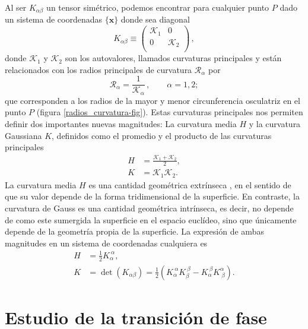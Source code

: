 Al ser $K_{\alpha\beta}$ un tensor simétrico, podemos encontrar para cualquier
punto $P$ dado un sistema de coordenadas $\{\mathbf{x}\}$ donde sea diagonal
\begin{equation*}
K_{\alpha\beta}\equiv\left(\begin{array}{cc}
\mathcal{K}_1 & 0\\
0 & \mathcal{K}_2\\
\end{array}\right)\, ,
\end{equation*} 
donde $\mathcal{K}_1$ y $\mathcal{K}_2$ son los autovalores, llamados
curvaturas principales y están relacionados con los radios principales
de curvatura $\mathcal{R}_{\alpha}$ por
\begin{equation*}
\mathcal{R}_{\alpha}=\frac{1}{\mathcal{K}_{\alpha}} \, , \qquad \alpha=1,2;
\end{equation*}
que corresponden a los radios de la mayor y menor circunferencia osculatriz en
el punto $P$ (figura \ref{radios_curvatura-fig}).
Estas curvaturas principales nos permiten definir dos importantes nuevas magnitudes:
La curvatura media $H$ y la curvatura Gaussiana $K$, definidos como el
promedio y el producto de las curvaturas principales
\begin{align*}
H&=\frac{\mathcal{K}_1+\mathcal{K}_2}{2},\\
K&=\mathcal{K}_1\mathcal{K}_2.
\end{align*}
La curvatura media $H$ es una cantidad geométrica extrínseca \cite{LuisLinares}, en el sentido de
que su valor depende de la forma tridimensional de la superficie. En
contraste, la curvatura de Gauss es una cantidad geométrica intrínseca, es
decir, no depende de como este sumergida la superficie en el espacio euclídeo,
sino que únicamente depende de la geometría propia de la superficie. La
expresión de ambas magnitudes en un sistema de coordenadas cualquiera es
\begin{align}
H&= \frac{1}{2}K_{\alpha}^{\ \alpha},\label{curvatura_media}\\
K&= \det(K_{\alpha\beta})=\frac{1}{2}(K_{\alpha}^{\ \alpha}K_{\beta}^{\ \beta}-K_{\alpha}^{\ \beta}K^{\alpha}_{\ \beta}).\label{curvatura_gaussiana}
\end{align}

\section{Estudio de la transición de fase}

